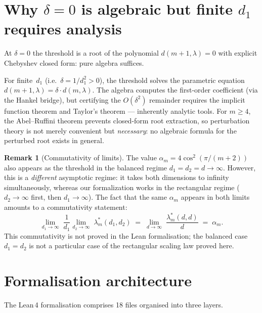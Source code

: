 \documentclass[11pt,a4paper]{article}
\theoremstyle{plain}
\theoremstyle{definition}
\newtheorem{remark}[theorem]{Remark}
\newcommand{\alpham}{\alpha_m}
\begin{document}
\section{Why $\delta = 0$ is algebraic but finite $d_1$
requires analysis}
\label{sec:algebra-vs-analysis}

At $\delta = 0$ the threshold is a root of the polynomial
$d(m{+}1,\lambda) = 0$ with explicit Chebyshev closed form:
pure algebra suffices.

For finite~$d_1$ (i.e.\ $\delta = 1/d_1^2 > 0$), the threshold
solves the parametric equation
$d(m{+}1,\lambda) = \delta \cdot d(m,\lambda)$.
The algebra computes the first-order coefficient (via the
Hankel bridge), but certifying the $O(\delta^2)$ remainder
requires the implicit function theorem and Taylor's theorem ---
inherently analytic tools.  For $m \ge 4$, the Abel--Ruffini
theorem prevents closed-form root extraction, so perturbation
theory is not merely convenient but \emph{necessary}: no algebraic
formula for the perturbed root exists in general.

\begin{remark}[Commutativity of limits]
\label{rem:limits}
The value $\alpham = 4\cos^2(\pi/(m{+}2))$ also appears as the
threshold in the balanced regime $d_1 = d_2 = d \to \infty$.
However, this is a \emph{different} asymptotic regime: it
takes both dimensions to infinity simultaneously, whereas our
formalization works in the rectangular regime ($d_2 \to \infty$
first, then $d_1 \to \infty$).  The fact that the same
$\alpham$ appears in both limits amounts to a commutativity
statement:
\[
  \lim_{d_1 \to \infty}\;
  \frac{1}{d_1}
  \lim_{d_2 \to \infty}\;
  \lambda^*_m(d_1, d_2)
  \;=\;
  \lim_{d \to \infty}\;
  \frac{\lambda^*_m(d, d)}{d}
  \;=\; \alpham.
\]
This commutativity is not proved in the Lean formalisation;
the balanced case $d_1 = d_2$ is not a particular case of
the rectangular scaling law proved here.
\end{remark}

\section{Formalisation architecture}
\label{sec:architecture}

The Lean\,4 formalisation comprises 18 files organised into
three layers.

\medskip
\end{document}
